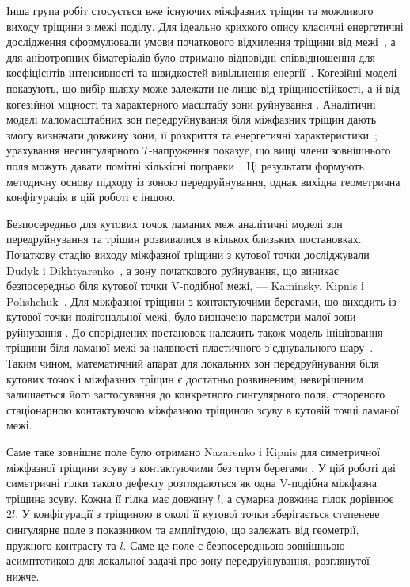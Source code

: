 Інша група робіт стосується вже існуючих міжфазних тріщин та можливого
виходу тріщини з межі поділу. Для ідеально крихкого опису класичні
енергетичні дослідження сформулювали умови початкового відхилення тріщини
від межі~\cite{HeHutchinson1989}, а для анізотропних біматеріалів було
отримано відповідні співвідношення для коефіцієнтів інтенсивності та
швидкостей вивільнення енергії~\cite{Wang1994}. Когезійні моделі
показують, що вибір шляху може залежати не лише від тріщиностійкості, а й
від когезійної міцності та характерного масштабу зони руйнування
\cite{ParmigianiThouless2006}. Аналітичні моделі маломасштабних зон
передруйнування біля міжфазних тріщин дають змогу визначати довжину зони,
її розкриття та енергетичні характеристики~\cite{KaminskyEtAl2023}; урахування несингулярного $T$-напруження
показує, що вищі члени зовнішнього поля можуть давати помітні кількісні
поправки~\cite{KaminskyDudykChornoivan2026}. Ці результати формують
методичну основу підходу із зоною передруйнування, однак вихідна
геометрична конфігурація в цій роботі є іншою.

Безпосередньо для кутових точок ламаних меж аналітичні моделі зон
передруйнування та тріщин розвивалися в кількох близьких постановках. Початкову стадію
виходу міжфазної тріщини з кутової точки досліджували Dudyk і
Dikhtyarenko~\cite{DudykDikhtyarenko2012}, а зону початкового руйнування,
що виникає безпосередньо біля кутової точки V-подібної межі, ---
Kaminsky, Kipnis і Polishchuk~\cite{KaminskyKipnisPolishchuk2012}. Для
міжфазної тріщини з контактуючими берегами, що виходить із кутової точки
полігональної межі, було визначено параметри малої зони руйнування
\cite{KaminskyDudykFenkiv2023}. До споріднених постановок належить також
модель ініціювання тріщини біля ламаної межі за наявності пластичного
з'єднувального шару~\cite{KaminskyDudykPolishchuk2024}. Таким чином,
математичний апарат для локальних зон передруйнування біля кутових точок
і міжфазних тріщин є достатньо розвиненим; невирішеним залишається його
застосування до конкретного сингулярного поля, створеного стаціонарною контактуючою
міжфазною тріщиною зсуву в кутовій точці ламаної межі.

Саме таке зовнішнє поле було отримано Nazarenko і Kipnis для симетричної
міжфазної тріщини зсуву з контактуючими без тертя берегами
\cite{NazarenkoKipnis2022Stress}. У цій роботі дві симетричні гілки
такого дефекту розглядаються як одна V-подібна міжфазна тріщина зсуву.
Кожна її гілка має довжину $l$, а сумарна довжина гілок дорівнює $2l$.
У конфігурації з тріщиною в околі її кутової точки зберігається
степеневе сингулярне поле з показником та амплітудою, що залежать від
геометрії, пружного контрасту та $l$. Саме це поле є безпосередньою
зовнішньою асимптотикою для локальної задачі про зону передруйнування,
розглянутої нижче.

